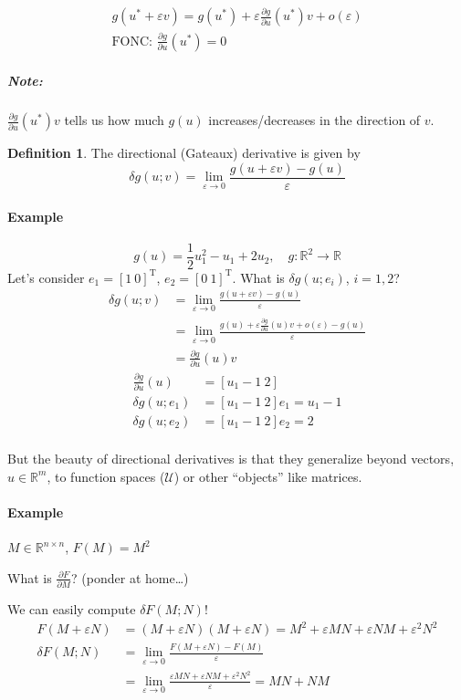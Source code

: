 \documentclass[letterpaper,12pt,titlepage]{report}
\newcommand{\trans}{^\text{T}}
\newcommand*\pder[2]{\frac{\partial #1}{\partial #2}}
\newcommand*\R{\mathbb{R}}
\theoremstyle{plain}
\theoremstyle{definition}
\newtheorem*{defi}{Definition}
\begin{document}
\begin{gather}
  g(u^* + \varepsilon v) = g(u^*) + \varepsilon \pder{g}{u}(u^*) v + o(\varepsilon) \\
  \text{FONC: } \pder{g}{u}(u^*) = 0 \hspace{3cm} 
\end{gather}

\subparagraph{Note:} $\pder{g}{u}(u^*) v$ tells us how much $g(u)$ increases/decreases in the direction of $v$.

\begin{defi}
  The directional (Gateaux) derivative is given by
  \[ \delta g(u;v) = \lim_{\varepsilon\to0} \frac{g(u+\varepsilon v)-g(u)}{\varepsilon} \]
\end{defi}

\paragraph{Example}
\[ g(u) = \frac12 u_1^2 - u_1 + 2u_2, \quad g:\R^2\to\R \]
Let's consider $e_1=[1\ 0]\trans$, $e_2=[0\ 1]\trans$. What is $\delta g(u;e_i)$, $i=1,2$?
\begin{align}
  \delta g(u;v) &= \lim_{\varepsilon\to0} \frac{g(u+\varepsilon v)-g(u)}{\varepsilon} \\
                &= \lim_{\varepsilon\to0} \frac{g(u)+\varepsilon\pder{g}{u}(u) v + o(\varepsilon) - g(u)}{\varepsilon} \\
                &= \pder{g}{u} (u) v
\end{align}
\begin{align}
  \pder{g}{u}(u) &= [u_1-1\ 2] \\
  \delta g(u;e_1) &= [u_1-1\ 2] e_1 = u_1-1 \\
  \delta g(u;e_2) &= [u_1-1\ 2] e_2 = 2 \\
\end{align}

But the beauty of directional derivatives is that they generalize beyond vectors, $u\in\R^m$, to function spaces ($\mathcal U$) or other ``objects'' like matrices.

\paragraph{Example} $M\in\R^{n\times n}$, $F(M)=M^2$

What is $\pder{F}{M}$? (ponder at home\dots)

We can easily compute $\delta F(M;N)$!
\begin{align}
  F(M+\varepsilon N) &= (M+\varepsilon N)(M+\varepsilon N) = M^2 + \varepsilon M N + \varepsilon N M + \varepsilon^2 N^2 \\
  \delta F(M;N) &= \lim_{\varepsilon\to0} \frac{F(M+\varepsilon N)-F(M)}{\varepsilon} \\
                     &= \lim_{\varepsilon\to0} \frac{\varepsilon M N + \varepsilon N M + \varepsilon^2 N^2}{\varepsilon} = MN + NM
\end{align}
\end{document}
